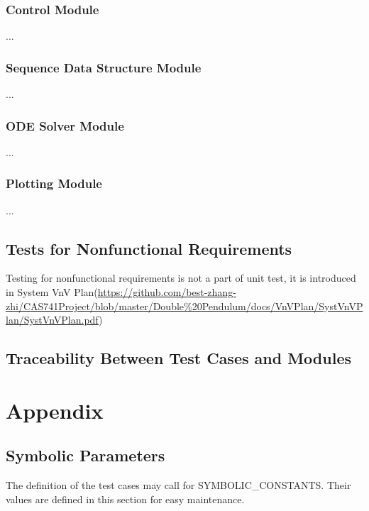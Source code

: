 \documentclass[12pt, titlepage]{article}
\begin{document}
\subsubsection{Control Module}

...
\subsubsection{Sequence Data Structure Module
}

...
\subsubsection{ODE Solver Module}

...
\subsubsection{Plotting Module
}

...

\subsection{Tests for Nonfunctional Requirements}
Testing for nonfunctional requirements is not a part of unit test, it is introduced in System VnV Plan(\url{https://github.com/best-zhang-zhi/CAS741Project/blob/master/Double%20Pendulum/docs/VnVPlan/SystVnVPlan/SystVnVPlan.pdf})
 
\subsection{Traceability Between Test Cases and Modules}






\newpage

\section{Appendix}


\subsection{Symbolic Parameters}

The definition of the test cases may call for SYMBOLIC\_CONSTANTS.
Their values are defined in this section for easy maintenance. 
\end{document}
